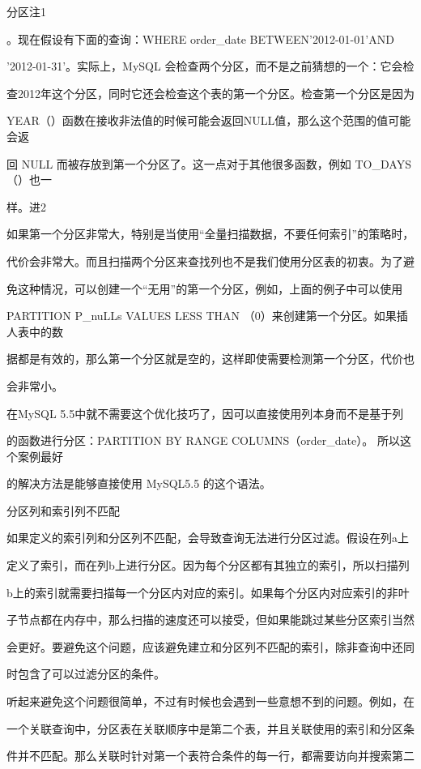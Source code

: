 分区注1

。现在假设有下面的查询：WHERE order\_date BETWEEN'2012-01-01'AND

'2012-01-31'。实际上，MySQL 会检查两个分区，而不是之前猜想的一个：它会检

查2012年这个分区，同时它还会检查这个表的第一个分区。检查第一个分区是因为

YEAR（）函数在接收非法值的时候可能会返回NULL值，那么这个范围的值可能会返

回 NULL 而被存放到第一个分区了。这一点对于其他很多函数，例如 TO\_DAYS（）也一

样。进2

如果第一个分区非常大，特别是当使用“全量扫描数据，不要任何索引”的策略时，

代价会非常大。而且扫描两个分区来查找列也不是我们使用分区表的初衷。为了避

免这种情况，可以创建一个“无用”的第一个分区，例如，上面的例子中可以使用

PARTITION P\_nuLLs VALUES LESS THAN （0）来创建第一个分区。如果插人表中的数

据都是有效的，那么第一个分区就是空的，这样即使需要检测第一个分区，代价也

会非常小。

在MySQL 5.5中就不需要这个优化技巧了，因可以直接使用列本身而不是基于列

的函数进行分区：PARTITION BY RANGE COLUMNS（order\_date）。 所以这个案例最好

的解决方法是能够直接使用 MySQL5.5 的这个语法。

分区列和索引列不匹配

如果定义的索引列和分区列不匹配，会导致查询无法进行分区过滤。假设在列a上

定义了索引，而在列b上进行分区。因为每个分区都有其独立的索引，所以扫描列

b上的索引就需要扫描每一个分区内对应的索引。如果每个分区内对应索引的非叶

子节点都在内存中，那么扫描的速度还可以接受，但如果能跳过某些分区索引当然

会更好。要避免这个问题，应该避免建立和分区列不匹配的索引，除非查询中还同

时包含了可以过滤分区的条件。

听起来避免这个问题很简单，不过有时候也会遇到一些意想不到的问题。例如，在

一个关联查询中，分区表在关联顺序中是第二个表，并且关联使用的索引和分区条

件并不匹配。那么关联时针对第一个表符合条件的每一行，都需要访向并搜索第二

